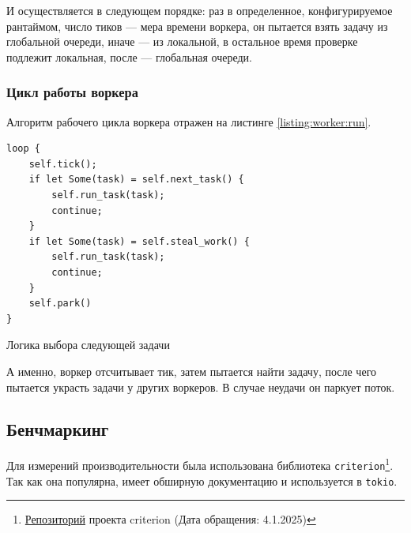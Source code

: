 И осуществляется в следующем порядке: раз в определенное, конфигурируемое рантаймом, число тиков --- мера времени воркера, он пытается взять задачу из глобальной очереди, иначе --- из локальной, в остальное время проверке подлежит локальная, после --- глобальная очереди.

\subsubsection{Цикл работы воркера}

Алгоритм рабочего цикла воркера отражен на листинге \ref{listing:worker:run}.

\begin{listing}[H]
    \begin{verbatim}
loop {
    self.tick();
    if let Some(task) = self.next_task() {
        self.run_task(task);
        continue;
    }
    if let Some(task) = self.steal_work() {
        self.run_task(task);
        continue;
    }
    self.park()
}
    \end{verbatim}

    \caption{Логика выбора следующей задачи}
    \label{listing:worker:run}
\end{listing}

А именно, воркер отсчитывает тик, затем пытается найти задачу, после чего пытается украсть задачи у других воркеров. В случае неудачи он паркует поток.

\subsection{Бенчмаркинг}

Для измерений производительности была использована библиотека \verb|criterion|\footnote{\href{https://github.com/bheisler/criterion.rs}{Репозиторий} проекта criterion (Дата обращения: 4.1.2025)}. Так как она популярна, имеет обширную документацию и используется в \verb|tokio|.
